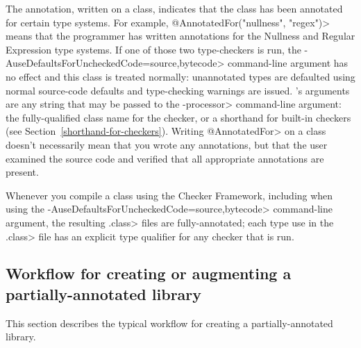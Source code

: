The  annotation, written on a
class, indicates that the class has been annotated for certain type
systems.  For example, \<@AnnotatedFor(\ttlcb"nullness", "regex"\ttrcb)> means that
the programmer has written annotations for the Nullness and Regular
Expression type systems.  If one of those two type-checkers is run,
the \<-AuseDefaultsForUncheckedCode=source,bytecode> command-line argument
has no effect and this class is treated normally:
unannotated types are defaulted using normal source-code
defaults and type-checking warnings are issued.
's arguments are any string that
may be passed to the \<-processor> command-line argument:  the
fully-qualified class name for the checker, or a shorthand for built-in
checkers (see Section~\ref{shorthand-for-checkers}).
Writing \<@AnnotatedFor> on a class doesn't necessarily mean that you wrote
any annotations, but that the user examined the source code and verified
that all appropriate annotations are present.

\begin{sloppypar}
Whenever you compile a class using the Checker Framework, including when
using the \<-AuseDefaultsForUncheckedCode=source,bytecode> command-line
argument, the resulting \<.class> files are fully-annotated; each type use
in the \<.class> file has an explicit type qualifier for any checker that
is run.
\end{sloppypar}


\subsection{Workflow for creating or augmenting a partially-annotated library\label{compiling-libraries-workflow}}

This section describes the typical workflow for creating a
partially-annotated library.

